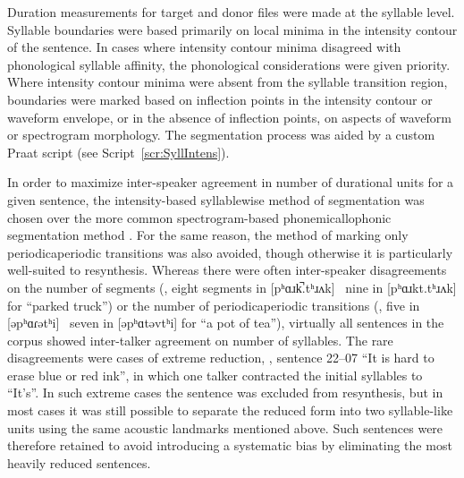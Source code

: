 
Duration measurements for target and donor files were made at the syllable level.  Syllable boundaries were based primarily on local minima in the intensity contour of the sentence.  In cases where intensity contour minima disagreed with phonological syllable affinity, the phonological considerations were given priority.\footnotemark{}  Where intensity contour minima were absent from the syllable transition region, boundaries were marked based on inflection points in the intensity contour or waveform envelope, or in the absence of inflection points, on aspects of waveform or spectrogram morphology.  The segmentation process was aided by a custom Praat script (see Script~\ref{scr:SyllIntens}).


In order to maximize inter-speaker agreement in number of durational units for a given sentence, the intensity-based syllablewise method of segmentation was chosen over the more common spectrogram-based phonemic\slsh{}allophonic segmentation method \citep[\eg][]{PetersonLehiste1960, TurkEtAl2006}.  For the same reason, the method of marking only periodic\slsh{}aperiodic transitions was also avoided, though otherwise it is particularly well-suited to \psola{} resynthesis.  Whereas there were often inter-speaker disagreements on the number of segments (\eg, eight segments in [pʰɑɹk̚.tʰɹʌk] \vs\ nine in [pʰɑɹkt.tʰɹʌk] for “parked truck”) or the number of periodic\slsh{}aperiodic transitions (\eg, five in [əpʰɑɾətʰi] \vs\ seven in [əpʰɑtəvtʰi] for “a pot of tea”), virtually all sentences in the corpus showed inter-talker agreement on number of syllables.  The rare disagreements were cases of extreme reduction, \eg, sentence 22–07 “It is hard to erase blue or red ink”, in which one talker contracted the initial syllables to “It’s”.  In such extreme cases the sentence was excluded from resynthesis, but in most cases it was still possible to separate the reduced form into two syllable-like units using the same acoustic landmarks mentioned above.  Such sentences were therefore retained to avoid introducing a systematic bias by eliminating the most heavily reduced sentences.

